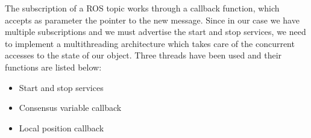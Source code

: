 The subscription of a ROS topic works through a callback function, which accepts as
parameter the pointer to the new message. Since in our case we have multiple subscriptions
and we must advertise the start and stop services, we need to implement a multithreading
architecture which takes care of the concurrent accesses to the state of our object.
Three threads have been used and their functions are listed below:
\begin{itemize}
  \item Start and stop services
  \item Consensus variable callback
  \item Local position callback
\end{itemize}






